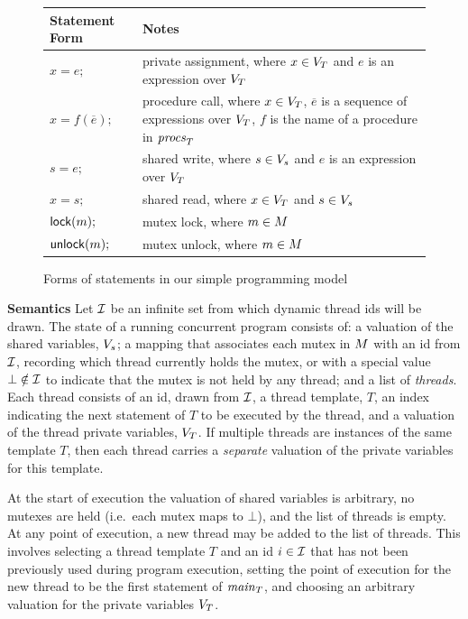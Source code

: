 \begin{figure}
\begin{tabular}{lp{5.5cm}}
\textbf{Statement Form} & \textbf{Notes} \\
\toprule

$x = e;$ & private assignment, where $x \in V_{T}$ and $e$ is an expression over $V_{T}$ \\
\midrule

$x = f(\overline{e});$ & procedure call, where $x \in V_{T}$, $\overline{e}$ is a sequence of expressions over $V_{T}$, $f$ is the name of a procedure in $\mathit{procs}_{T}$ \\
\midrule

$s = e;$ & shared write, where $s \in V_s$ and $e$ is an expression over $V_{T}$ \\
\midrule

$x = s;$ & shared read,  where $x \in V_{T}$ and $s \in V_s$ \\
\midrule

$\mathsf{lock}(m);$   & mutex lock, where $m \in M$ \\
\midrule

$\mathsf{unlock}(m);$ & mutex unlock, where $m \in M$\\
\bottomrule
\end{tabular}
\caption{Forms of statements in our simple programming model}
\label{fig:statements}
\end{figure}

\medskip\noindent\textbf{Semantics }
%
Let $\mathcal{I}$ be an infinite set from which dynamic thread ids will be drawn.  The state of a running concurrent program consists of: a valuation of the shared variables, $V_s$; a mapping that associates each mutex in $M$ with an id from $\mathcal{I}$, recording which thread currently holds the mutex, or with a special value $\bot \notin \mathcal{I}$ to indicate that the mutex is not held by any thread; and a list of \emph{threads}.  Each thread consists of an id, drawn from $\mathcal{I}$, a thread template, $T$, an index indicating the next statement of $T$ to be executed by the thread, and a valuation of the thread private variables, $V_{T}$.  If multiple threads are instances of the same template $T$, then each thread carries a \emph{separate} valuation of the private variables for this template.

At the start of execution the valuation of shared variables is arbitrary, no mutexes are held (i.e.\ each mutex maps to $\bot$), and the list of threads is empty.
%
At any point of execution, a new thread may be added to the list of threads.  This involves selecting a thread template $T$ and an id $i \in \mathcal{I}$ that has not been previously used during program execution, setting the point of execution for the new thread to be the first statement of $\mathit{main}_{T}$, and choosing an arbitrary valuation for the private variables $V_{T}$.

